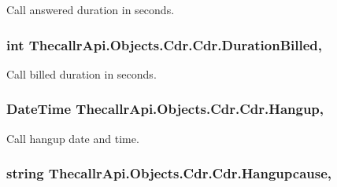 Call answered duration in seconds. 

\hypertarget{class_thecallr_api_1_1_objects_1_1_cdr_1_1_cdr_a289efda31c58ea9d18f5710486bd67f5}{
\subsubsection[{Duration\+Billed}]{\setlength{\rightskip}{0pt plus 5cm}int Thecallr\+Api.\+Objects.\+Cdr.\+Cdr.\+Duration\+Billed\hspace{0.3cm}{\ttfamily [get]}, {\ttfamily [set]}}}\label{class_thecallr_api_1_1_objects_1_1_cdr_1_1_cdr_a289efda31c58ea9d18f5710486bd67f5}


Call billed duration in seconds. 

\hypertarget{class_thecallr_api_1_1_objects_1_1_cdr_1_1_cdr_ad8e4ffb8e2851da0211728bb14d5b483}{
\subsubsection[{Hangup}]{\setlength{\rightskip}{0pt plus 5cm}Date\+Time Thecallr\+Api.\+Objects.\+Cdr.\+Cdr.\+Hangup\hspace{0.3cm}{\ttfamily [get]}, {\ttfamily [set]}}}\label{class_thecallr_api_1_1_objects_1_1_cdr_1_1_cdr_ad8e4ffb8e2851da0211728bb14d5b483}


Call hangup date and time. 

\hypertarget{class_thecallr_api_1_1_objects_1_1_cdr_1_1_cdr_aa3bfc9609582e77e9093b0834996cd91}{
\subsubsection[{Hangupcause}]{\setlength{\rightskip}{0pt plus 5cm}string Thecallr\+Api.\+Objects.\+Cdr.\+Cdr.\+Hangupcause\hspace{0.3cm}{\ttfamily [get]}, {\ttfamily [set]}}}\label{class_thecallr_api_1_1_objects_1_1_cdr_1_1_cdr_aa3bfc9609582e77e9093b0834996cd91}


